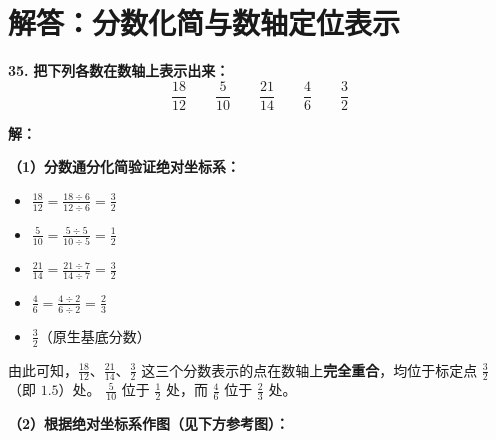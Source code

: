 \section{解答：分数化简与数轴定位表示}

\vspace{0.6cm}

\textbf{\LARGE 35.} \textbf{把下列各数在数轴上表示出来：}
\[
\frac{18}{12} \qquad \frac{5}{10} \qquad \frac{21}{14} \qquad \frac{4}{6} \qquad \frac{3}{2}
\]

\vspace{0.4cm}
\textbf{解：}

\textbf{（1）分数通分化简验证绝对坐标系：}
\begin{itemize}
    \item $\displaystyle \frac{18}{12} = \frac{18 \div 6}{12 \div 6} = \frac{3}{2}$
    \item $\displaystyle \frac{5}{10} = \frac{5 \div 5}{10 \div 5} = \frac{1}{2}$
    \item $\displaystyle \frac{21}{14} = \frac{21 \div 7}{14 \div 7} = \frac{3}{2}$
    \item $\displaystyle \frac{4}{6} = \frac{4 \div 2}{6 \div 2} = \frac{2}{3}$
    \item $\displaystyle \frac{3}{2}$（原生基底分数）
\end{itemize}
由此可知，$\displaystyle\frac{18}{12}、\frac{21}{14}、\frac{3}{2}$ 这三个分数表示的点在数轴上\textbf{完全重合}，均位于标定点 $\displaystyle\frac{3}{2}$（即 $1.5$）处。
$\displaystyle\frac{5}{10}$ 位于 $\displaystyle\frac{1}{2}$ 处，而 $\displaystyle\frac{4}{6}$ 位于 $\displaystyle\frac{2}{3}$ 处。

\vspace{0.4cm}
\textbf{（2）根据绝对坐标系作图（见下方参考图）：}

